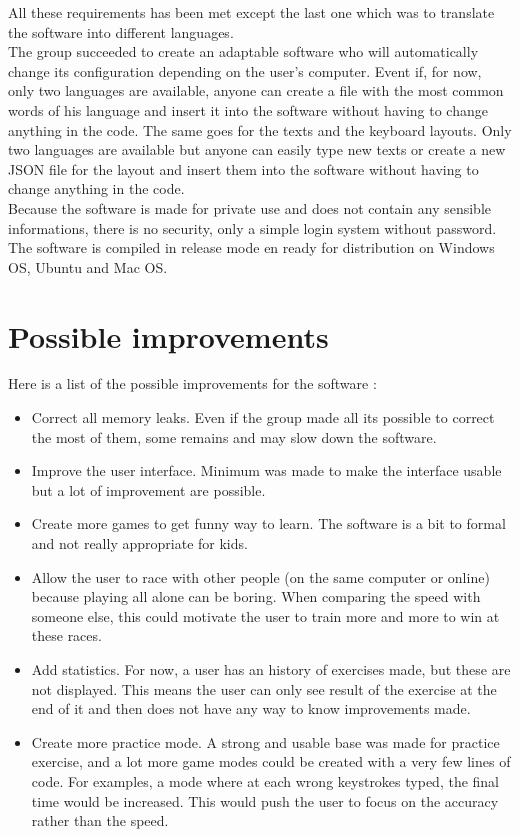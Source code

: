 All these requirements has been met except the last one which was to translate the software into different languages.\\
The group succeeded to create an adaptable software who will automatically change its configuration depending on the user's computer. Event if, for now, only two languages are available, anyone can create a file with the most common words of his language and insert it into the software without having to change anything in the code. The same goes for the texts and the keyboard layouts. Only two languages are available but anyone can easily type new texts or create a new JSON file for the layout and insert them into the software without having to change anything in the code.\\
Because the software is made for private use and does not contain any sensible informations, there is no security, only a simple login system without password.\\
The software is compiled in release mode en ready for distribution on Windows OS, Ubuntu and Mac OS.

\chapter{Possible improvements}
Here is a list of the possible improvements for the software :
\begin{itemize}
	\item Correct all memory leaks. Even if the group made all its possible to correct the most of them, some remains and may slow down the software.
	\item Improve the user interface. Minimum was made to make the interface usable but a lot of improvement are possible.
	\item Create more games to get funny way to learn. The software is a bit to formal and not really appropriate for kids.
	\item Allow the user to race with other people (on the same computer or online) because playing all alone can be boring. When comparing the speed with someone else, this could motivate the user to train more and more to win at these races.
	\item Add statistics. For now, a user has an history of exercises made, but these are not displayed. This means the user can only see result of the exercise at the end of it and then does not have any way to know improvements made.
	\item Create more practice mode. A strong and usable base was made for practice exercise, and a lot more game modes could be created with a very few lines of code. For examples, a mode where at each wrong keystrokes typed, the final time would be increased. This would push the user to focus on the accuracy rather than the speed.
\end{itemize}



